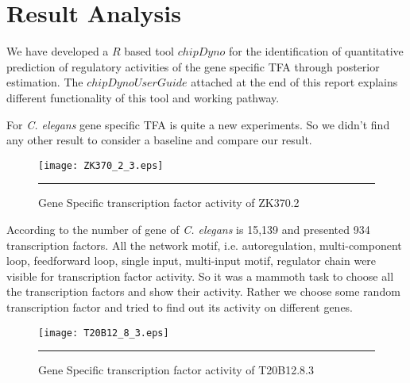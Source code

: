 \section{Result Analysis}
We have developed a $R$ based tool $chipDyno$ for the identification of 
quantitative prediction of regulatory activities of the gene specific TFA through posterior estimation.
The $chipDyno User Guide$ attached at the end of this report explains different functionality 
of this tool and working pathway.

For \textit{C. elegans} gene specific TFA is quite a new experiments. So we didn't find any other result to
consider a baseline and compare our result. 

\begin{figure}
	\centering
		\texttt{[image: ZK370\_2\_3.eps]}
		\rule{35em}{0.5pt}
	\caption[Gene Specific transcription factor activity of ZK370.2]
		{Gene Specific transcription factor activity of ZK370.2}
	\label{fig:TFA_of_of_ZK370.2}
\end{figure}

According to \cite{WormNet} the number of gene of \textit{C. elegans} is 15,139 
and \cite{Inmaculada:2007} presented 934 transcription factors. All the network motif, i.e.
autoregulation, multi-component loop, feedforward loop, single input, multi-input motif, regulator chain
were visible for transcription factor activity. So it was a mammoth task to choose all the transcription
factors and show their activity. Rather we choose some random transcription factor and tried to 
find out its activity on different genes.

\begin{figure}
	\centering
		\texttt{[image: T20B12\_8\_3.eps]}
		\rule{35em}{0.5pt}
	\caption[Gene Specific transcription factor activity of T20B12.8.3]
		{Gene Specific transcription factor activity of T20B12.8.3}
	\label{fig:TFA_of_of_T20B12_8_3}
\end{figure}

